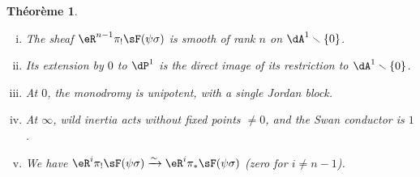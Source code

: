 \documentclass[oneside]{book}
\newcommand{\iso}{\xrightarrow\sim}
\renewcommand{\setminus}{\smallsetminus}
\theoremstyle{sga-source}
\theoremstyle{sga-source-dash}
\theoremstyle{sga-source-dotdash}
\theoremstyle{sga-source-number-note-dash}
\theoremstyle{sga-source-note-number-dotdash}
\theoremstyle{sga-source-example-dotdash}
\theoremstyle{sga-source-inline-number}
\theoremstyle{sga-source-bare-number}
\theoremstyle{sga-source}
\newtheorem{theorem_}[subsection]{Théorème}
\newcommand{\PrintPage}[1]{}\newcommand{\MathPage}[1]{}\newcommand{\PrintCite}[2]{#1}\newcommand{\var}[3]{#1}
\begin{document}
\begin{theorem_}\label{VI:7-8}
\begin{enumerate}[(i)]
  \item The sheaf $\eR^{n-1}\pi_! \sF(\psi\sigma)$ is smooth of rank $n$ on 
    $\dA^1\setminus \{0\}$. 
  \item Its extension by $0$ to $\dP^1$ is the direct image of its 
    restriction to $\dA^1\setminus \{0\}$. 
  \PrintPage{222}
\item At $0$, the monodromy is unipotent, with a single Jordan block.
  \item At $\infty$, wild inertia acts without fixed points $\ne 0$, and the 
    Swan conductor is $1$. 
  \item We have $\eR^i \pi_! \sF(\psi\sigma) \iso \eR^i \pi_\ast \sF(\psi\sigma)$ 
    (zero for $i\ne n-1$).
\end{enumerate}
\end{theorem_}
\end{document}
